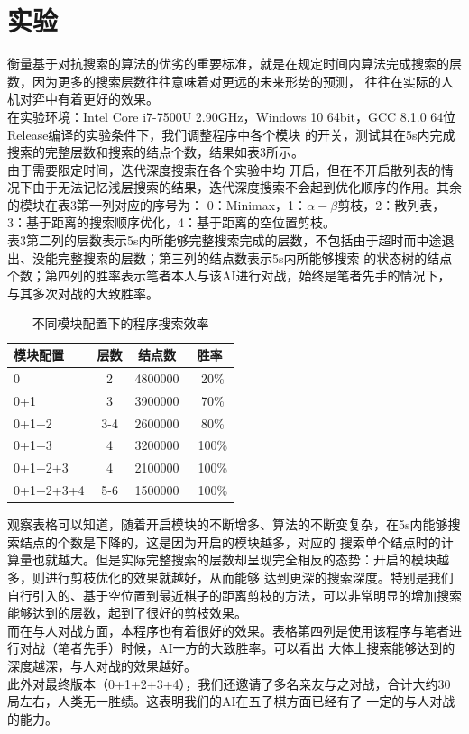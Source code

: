 \documentclass{acm_proc_article-sp}
\begin{document}
\section{\textbf{实验}}
衡量基于对抗搜索的算法的优劣的重要标准，就是在规定时间内算法完成搜索的层数，因为更多的搜索层数往往意味着对更远的未来形势的预测，
往往在实际的人机对弈中有着更好的效果。\\
在实验环境：Intel Core i7-7500U 2.90GHz，Windows 10 64bit，GCC 8.1.0 64位Release编译的实验条件下，我们调整程序中各个模块
的开关，测试其在5s内完成搜索的完整层数和搜索的结点个数，结果如表3所示。\\
由于需要限定时间，迭代深度搜索在各个实验中均
开启，但在不开启散列表的情况下由于无法记忆浅层搜索的结果，迭代深度搜索不会起到优化顺序的作用。其余的模块在表3第一列对应的序号为：
0：Minimax，1：$\alpha-\beta$剪枝，2：散列表，3：基于距离的搜索顺序优化，4：基于距离的空位置剪枝。\\
表3第二列的层数表示5s内所能够完整搜索完成的层数，不包括由于超时而中途退出、没能完整搜索的层数；第三列的结点数表示5s内所能够搜索
的状态树的结点个数；第四列的胜率表示笔者本人与该AI进行对战，始终是笔者先手的情况下，与其多次对战的大致胜率。\\
\begin{table}
    \small
    \centering
    \caption{不同模块配置下的程序搜索效率}
    \begin{tabular}{|l|c|c|c|} \hline
    模块配置 & 层数 & 结点数 & 胜率\\ \hline
    0 & 2 & 4800000 & ~20\% \\ \hline
    0+1 & 3 & 3900000 & ~70\% \\ \hline
    0+1+2 & 3-4 & 2600000 & ~80\% \\ \hline
    0+1+3 & 4 & 3200000 & ~100\% \\ \hline
    0+1+2+3 & 4 & 2100000 & ~100\% \\ \hline
    0+1+2+3+4 & 5-6 & 1500000 & ~100\% \\ \hline
    \end{tabular}
\end{table}
观察表格可以知道，随着开启模块的不断增多、算法的不断变复杂，在5s内能够搜索结点的个数是下降的，这是因为开启的模块越多，对应的
搜索单个结点时的计算量也就越大。但是实际完整搜索的层数却呈现完全相反的态势：开启的模块越多，则进行剪枝优化的效果就越好，从而能够
达到更深的搜索深度。特别是我们自行引入的、基于空位置到最近棋子的距离剪枝的方法，可以非常明显的增加搜索能够达到的层数，起到了很好的剪枝效果。\\
而在与人对战方面，本程序也有着很好的效果。表格第四列是使用该程序与笔者进行对战（笔者先手）时候，AI一方的大致胜率。可以看出
大体上搜索能够达到的深度越深，与人对战的效果越好。\\
此外对最终版本（0+1+2+3+4），我们还邀请了多名亲友与之对战，合计大约30局左右，人类无一胜绩。这表明我们的AI在五子棋方面已经有了
一定的与人对战的能力。
\end{document}
